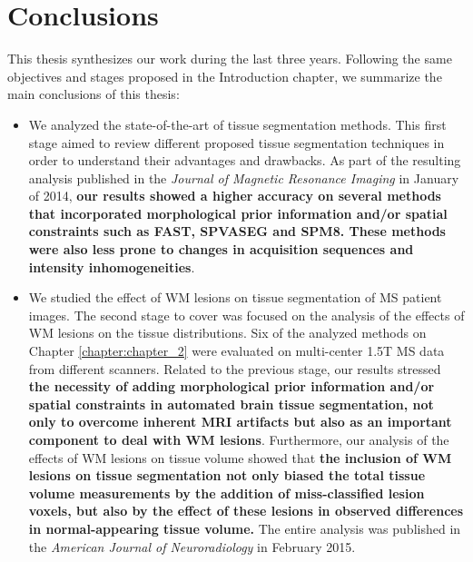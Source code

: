
\chapter{Conclusions}

This thesis synthesizes our work during the last three years. Following the same objectives and stages proposed in the Introduction chapter, we summarize the main conclusions of this thesis: 

\begin{itemize}

\item We analyzed the state-of-the-art of tissue segmentation methods. This first stage aimed to review different proposed tissue segmentation techniques in order to understand their advantages and drawbacks. As part of the resulting analysis published in the\textit{ Journal of Magnetic Resonance Imaging} in January of 2014,  
\textbf{our results showed a higher accuracy on several methods that incorporated morphological prior information and/or spatial constraints such as FAST, SPVASEG and SPM8. These methods were also less prone to changes in acquisition sequences and intensity inhomogeneities}.

\item We studied the effect of WM lesions on tissue segmentation of MS patient images. The second stage to cover was focused on the analysis of the effects of WM lesions on the tissue distributions. Six of the analyzed methods on Chapter \ref{chapter:chapter_2} were evaluated on multi-center 1.5T MS data from different scanners. 
Related to the previous stage, our results stressed \textbf{the necessity of adding morphological prior information and/or spatial constraints in automated brain tissue
segmentation, not only to overcome inherent MRI artifacts but also as an important component to deal with WM lesions}. Furthermore, our analysis of the effects of WM lesions on tissue volume showed that \textbf{the inclusion of WM lesions on tissue segmentation not only biased the total tissue volume measurements by the addition of miss-classified lesion voxels, but also by the effect of these lesions in observed differences in normal-appearing tissue volume.} The entire analysis was published in the \textit{American Journal of Neuroradiology} in February 2015.


\end{itemize}
